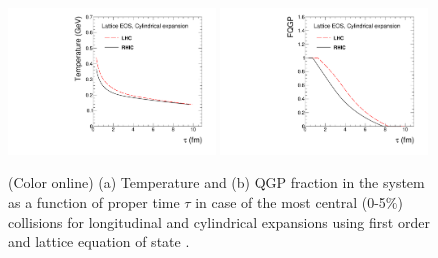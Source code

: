 \documentclass[aps,prc,preprint,superscriptaddress,showpacs,showkeys]{revtex4-1}
\begin{document}
\begin{figure}
\includegraphics[width=0.49\textwidth]{Figures/Fig1a_TempVsTauLatt.pdf}
\includegraphics[width=0.49\textwidth]{Figures/Fig1b_FQGPVsTauLatt.pdf}
\caption{(Color online) (a) Temperature and (b) QGP fraction in the system as a function of proper 
time $\tau$ in case of the most central (0-5$\%$) collisions for longitudinal and cylindrical expansions 
using first order and lattice equation of state . }
\label{fig:TauVsTemp}
\end{figure}




\end{document}
